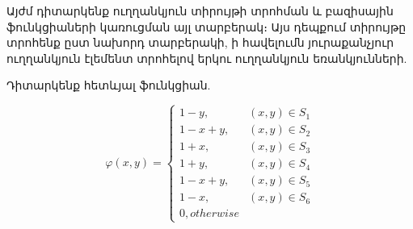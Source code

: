 \documentclass[fleqn, bachelor,subf,12pt,notitlepage]{disser}
\begin{document}
\newpage

\noindent Այժմ դիտարկենք ուղղանկյուն տիրույթի տրոհման և բազիսային ֆունկցիաների կառուցման այլ տարբերակ։ Այս դեպքում տիրույթը տրոհենք ըստ նախորդ տարբերակի, ի հավելումն յուրաքանչյուր ուղղանկյուն էլեմենտ տրոհելով երկու ուղղանկյուն եռանկյունների.

Դիտարկենք հետևյալ ֆունկցիան.

$$\varphi \left(x,y\right)=\begin{cases}
1-y, &(x,y) \in S_{1} \\
1-x+y, &(x,y) \in S_{2} \\
1+x, &(x,y) \in S_{3} \\
1+y, &(x,y) \in S_{4} \\
1-x+y, &(x,y) \in S_{5} \\
1-x, &(x,y) \in S_{6}\\
0, otherwise
\end{cases} $$
\end{document}
